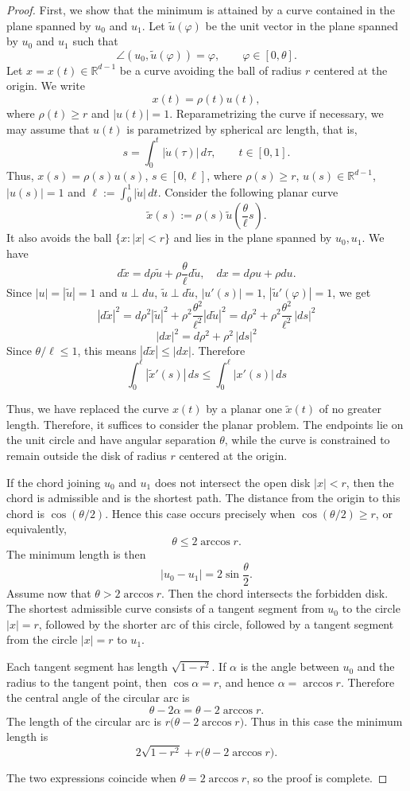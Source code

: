 \documentclass[a4paper,12pt,reqno]{amsart}
\begin{document}
\begin{proof}
First, we show that the minimum is attained by a curve contained in the plane spanned by \(u_0\) and \(u_1\). 
Let \(\tilde u(\varphi)\) be the unit vector in the plane spanned by \(u_0\) and \(u_1\) such that
\[
\angle(u_0,\tilde u(\varphi))=\varphi,
\qquad
\varphi\in[0,\theta].
\]
Let \(x=x(t)\in\mathbb R^{d-1}\) be a curve avoiding the ball of radius \(r\) centered at the origin. We write
\[
x(t)=\rho(t)u(t),
\]
where \(\rho(t)\ge r\) and \(|u(t)|=1\). Reparametrizing the curve if necessary, we may assume that \(u(t)\) is parametrized by spherical arc length, that is,
\[
s=\int_0^t |\dot u(\tau)|\,d\tau,
\qquad t\in[0,1].
\]
Thus, $x(s)=\rho(s)u(s)$, $s\in[0,\ell]$, where $\rho(s)\ge r$, $u(s)\in \mathbb{R}^{d-1}$, $|u(s)|=1$ and $\displaystyle \ell:=\int_0^1 |\dot{u}|\,dt$. Consider the following planar curve
\[
\tilde{x}(s):= \rho(s)\tilde{u}\left(\frac{\theta}{\ell} s\right).
\]
It also avoids the ball $\{x:|x|<r\}$ and lies in the plane spanned by $u_0,u_1$.
We have
\[
d\tilde{x} =d \rho \tilde{u}+\rho \frac{\theta}{\ell}d\tilde{u},\quad dx =d \rho u+\rho du.
\]
Since $|u|=|\tilde{u}|=1$ and $u\perp du$, $\tilde{u}\perp d \tilde{u}$, $|u'(s)|=1$, $|\tilde{u}'(\varphi)|=1$, we get
\[
|d\tilde{x}|^2=d\rho^2|\tilde{u}|^2+\rho^2 \frac{\theta^2}{\ell^2}|d\tilde{u}|^2=d\rho^2+\rho^2\frac{\theta^2}{\ell^2}\,|ds|^2
\]
\[
|dx|^2=d\rho^2+\rho^2\,|ds|^2
\]
Since $\displaystyle \theta/\ell\le 1$, this means $|d\tilde{x}|\le |dx|$. Therefore
\[
\int_0^{\ell}|\tilde{x}'(s)|\,ds\le \int_0^{\ell}|x'(s)|\,ds 
\]

Thus, we have replaced the curve $x(t)$ by a planar one $\tilde{x}(t)$ of no greater length. Therefore, it suffices to consider the planar problem. The endpoints lie on the unit circle and have angular separation \(\theta\), while the curve is constrained to remain outside the disk of radius \(r\) centered at the origin.

If the chord joining \(u_0\) and \(u_1\) does not intersect the open disk \(|x|<r\),
then the chord is admissible and is the shortest path. The distance from the origin
to this chord is \(\cos(\theta/2)\). Hence this case occurs precisely when $\cos(\theta/2)\ge r$, or equivalently,
\[
\theta\le 2\arccos r.
\]
The minimum length is then
\[
|u_0-u_1|=2\sin\frac{\theta}{2}.
\]
Assume now that $\theta>2\arccos r$.
Then the chord intersects the forbidden disk. The shortest admissible curve consists
of a tangent segment from \(u_0\) to the circle \(|x|=r\), followed by the shorter
arc of this circle, followed by a tangent segment from the circle \(|x|=r\) to \(u_1\).

Each tangent segment has length $\sqrt{1-r^2}$. If \(\alpha\) is the angle between \(u_0\) and the radius to the tangent point, then $\cos\alpha=r$, and hence $\alpha=\arccos r$. Therefore the central angle of the circular arc is
\[
\theta-2\alpha=\theta-2\arccos r. 
\]
The length of the circular arc is $r\bigl(\theta-2\arccos r\bigr)$. Thus in this case the minimum length is
\[
2\sqrt{1-r^2}+r\bigl(\theta-2\arccos r\bigr).
\]

The two expressions coincide when \(\theta=2\arccos r\), so the proof is complete.
\end{proof}
\end{document}
